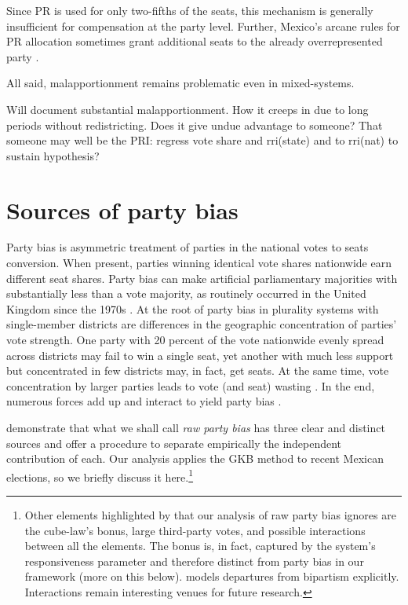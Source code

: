 \documentclass[letter,12pt]{article}
\begin{document}
Since PR is used for only two-fifths of the seats, this mechanism is generally insufficient for compensation at the party level. Further, Mexico's arcane rules for PR allocation sometimes grant additional seats to the already overrepresented party \citep{weldonMixedMemberSys2001}. 

All said, malapportionment remains problematic even in mixed-systems. 

Will document substantial malapportionment. How it creeps in due to long periods without redistricting. Does it give undue advantage to someone? That someone may well be the PRI: regress vote share and rri(state) and to rri(nat) to sustain hypothesis?

\section{Sources of party bias}

Party bias is asymmetric treatment of parties in the national votes to seats conversion. When present, parties winning identical vote shares nationwide earn different seat shares. Party bias can make artificial parliamentary majorities with substantially less than a vote majority, as routinely occurred in the United Kingdom since the 1970s \citep{lewisBeck.etal.2004forecastUKels}. At the root of party bias in plurality systems with single-member districts are differences in the geographic concentration of parties' vote strength. One party with 20 percent of the vote nationwide evenly spread across districts may fail to win a single seat, yet another with much less support but concentrated in few districts may, in fact, get seats. At the same time, vote concentration by larger parties leads to vote (and seat) wasting \citep{calvo.roddenMultipartyPlurality2015}. In the end, numerous forces add up and interact to yield party bias \citep{gudgin.taylor.1980decomposeBias}. 

\citet{grofman.etalBiasMalapp.1997} demonstrate that what we shall call \emph{raw party bias} has three clear and distinct sources and offer a procedure to separate empirically the independent contribution of each. Our analysis applies the GKB method to recent Mexican elections, so we briefly discuss it here.\footnote{Other elements highlighted by \citet{gudgin.taylor.1980decomposeBias} that our analysis of raw party bias ignores are the cube-law's bonus, large third-party votes, and possible interactions between all the elements. The bonus is, in fact, captured by the system's responsiveness parameter and therefore distinct from party bias in our framework (more on this below). \citet{calvo.2009roadToPR} models departures from bipartism explicitly. Interactions remain interesting venues for future research.}
\end{document}

